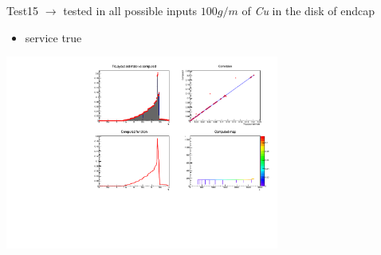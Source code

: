 \documentclass[pdftex, 11pt]{beamer}
\begin{document}
\begin{frame}
  \begin{block}{Test15 $\rightarrow$ \alert{tested in all possible inputs}}
    \alert{$100 g/m$} of \emph{Cu} in the disk of endcap
    \begin{itemize}
    \item \alert{service} true
    \end{itemize}
  \end{block}
  \begin{center}
    \includegraphics[width=9cm]{img/test15.pdf}
  \end{center}
\end{frame}
\end{document}
